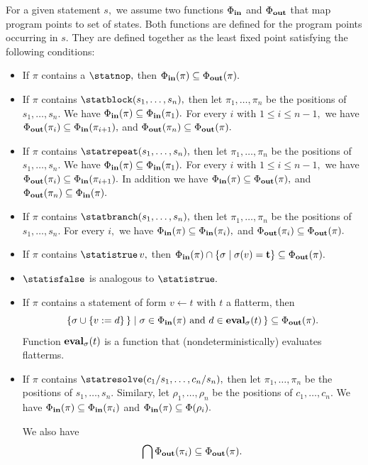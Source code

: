 \begin{definition}
   \label{Def_semantics}
   For a given statement $ s, $ we assume two functions
   $ \Phi_{\bf in} $ and $ \Phi_{\bf out} $ that map
   program points to set of states.
   Both functions are defined for the program points occurring
   in $ s. $ They are defined together as the least fixed point
   satisfying the following conditions:
\begin{itemize}
\item
   If $ \pi $ contains a $ \statnop, $ then
   $ \Phi_{\bf in}( \pi ) \subseteq \Phi_{\bf out}( \pi ). $
\item
   If $ \pi $ contains $ \statblock( s_1, \ldots, s_n), $
   then let $ \pi_1, \ldots, \pi_n $ be the positions of
   $ s_1, \ldots, s_n. $
   We have $ \Phi_{\bf in}( \pi ) \subseteq \Phi_{\bf in}( \pi_1). $
   For every $ i $ with $ 1 \leq i \leq n-1, $ we have
   $ \Phi_{\bf out}( \pi_i ) \subseteq \Phi_{\bf in}( \pi_{i+1} ), $ and
   $ \Phi_{\bf out}(\pi_n) \subseteq \Phi_{\bf out}(\pi). $
\item
   If $ \pi $ contains $ \statrepeat( s_1, \ldots, s_n ), $ then
   let $ \pi_1, \ldots, \pi_n $ be the positions of
   $ s_1, \ldots, s_n. $
   We have $ \Phi_{\bf in}( \pi ) \subseteq \Phi_{\bf in}( \pi_1). $
   For every $ i $ with $ 1 \leq i \leq n-1, $ we have
   $ \Phi_{\bf out}( \pi_i ) \subseteq \Phi_{\bf in}( \pi_{i+1} ). $
   In addition we have $ \Phi_{\bf in}(\pi) \subseteq \Phi_{\bf out}(\pi), $ and
   $ \Phi_{\bf out}( \pi_n ) \subseteq \Phi_{\bf in}(\pi). $
\item
   If $ \pi $ contains $ \statbranch( s_1, \ldots, s_n ), $
   then let $ \pi_1, \ldots, \pi_n $ be the positions of
   $ s_1, \ldots, s_n. $
   For every $ i, $ we have
   $ \Phi_{\bf in}( \pi ) \subseteq \Phi_{\bf in}( \pi_i ), $ and
   $ \Phi_{\bf out}( \pi_i ) \subseteq \Phi_{\bf out}(\pi). $
\item
   If $ \pi $ contains $ \statistrue \, v, $ then
   $ \Phi_{\bf in}( \pi ) \cap
     \{ \sigma \mid \sigma(v) = {\bf t} \} \subseteq
     \Phi_{\bf out}( \pi). $
\item
   $ \statisfalse $ is analogous to $ \statistrue. $
\item
   If $ \pi $ contains a statement of form $ v \leftarrow t $ with
   $ t $ a flatterm, then
   \[ \{ \sigma \cup \{ v := d \} \, \} \mid
           \sigma \in \Phi_{\bf in}(\pi) \mbox{ and }
           d \in {\bf eval}_{\sigma}(t) \, \} \subseteq
           \Phi_{\bf out}( \pi ). \]
   Function $ {\bf eval}_{\sigma}(t) $ is a function
   that (nondeterministically) evaluates flatterms. 
\item
   If $ \pi $ contains $ \statresolve( c_1/s_1, \ldots, c_n/s_n ), $
   then let $ \pi_1, \ldots, \pi_n $ be the positions of
   $ s_1, \ldots, s_n. $ Similary, let $ \rho_1, \ldots, \rho_n $
   be the positions of $ c_1, \ldots, c_n. $
   We have $ \Phi_{\bf in}(\pi) \subseteq \Phi_{\bf in}( \pi_i ) $ and
   $ \Phi_{\bf in}( \pi ) \subseteq \Phi( \rho_i ). $

   We also have
   \[ \bigcap \Phi_{\bf out}( \pi_i ) \subseteq \Phi_{\bf out}( \pi ). \]
\end{itemize}
\end{definition}
